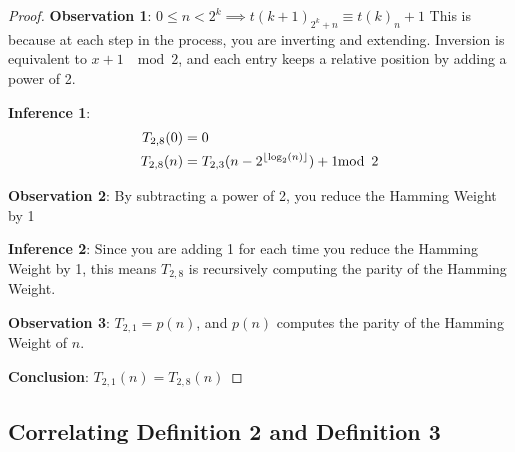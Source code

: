 \documentclass[conference]{IEEEtran}
\begin{document}
\begin{proof}
\par\noindent\par
    \textbf{Observation 1}: $0 \le n < 2^k \implies t(k+1)_{2^k + n} \equiv t(k)_n + 1$
    This is because at each step in the process, you are inverting and extending. Inversion is equivalent to $x + 1 \; \mod{2}$, and each entry keeps a relative position by adding a power of 2.

    \textbf{Inference 1}: \begin{equation}
        \begin{aligned}
            T_{2,8}(0) &= 0 \\
            T_{2,8}(n) &= T_{2,3}(n - 2^{\floor{\log_2(n)}}) + 1 \mod{2}
        \end{aligned}
    \end{equation}

    \textbf{Observation 2}: By subtracting a power of 2, you reduce the Hamming Weight by 1

    \textbf{Inference 2}: Since you are adding 1 for each time you reduce the Hamming Weight by 1, this means $T_{2,8}$ is recursively computing the parity of the Hamming Weight.

    \textbf{Observation 3}: $T_{2,1} = p(n)$, and $p(n)$ computes the parity of the Hamming Weight of $n$.

    \textbf{Conclusion}: $T_{2,1}(n) = T_{2,8}(n)$
\end{proof}

\subsection{Correlating Definition 2 and Definition 3}
\end{document}
